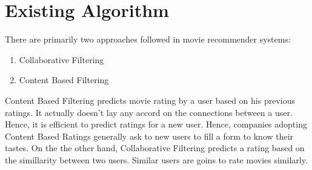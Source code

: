\documentclass[twocolumn]{article}
\begin{document}
\section*{Existing Algorithm}
There are primarily two approaches followed in movie recommender systems:
\begin{enumerate}
\item Collaborative Filtering
\item Content Based Filtering
\end{enumerate}
Content Based Filtering predicts movie rating by a user based on his previous ratings. It actually doesn't lay any accord on the connections between a user. Hence, it is efficient to predict ratings for a new user. Hence, companies adopting Content Based Ratings generally ask to new users to fill a form to know their tastes. On the the other hand, Collaborative Filtering predicts a rating based on the simillarity between two users. Similar users are goins to rate movies similarly.
\end{document}
